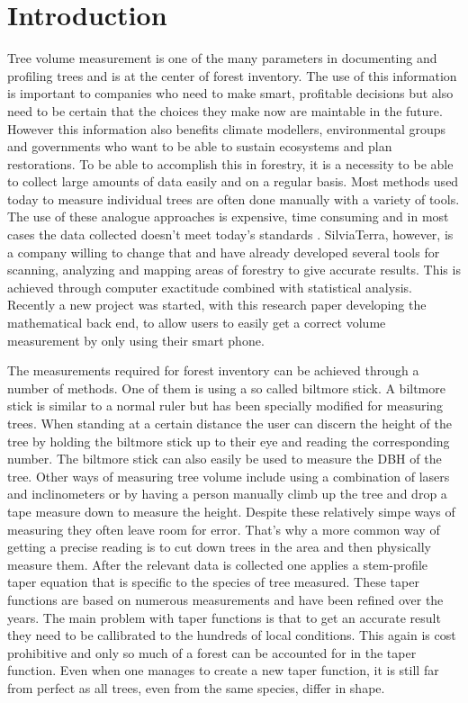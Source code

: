 

\newcommand{\degree}{$^\circ$}

\section{Introduction}
Tree volume measurement is one of the many parameters in documenting and profiling trees and is at the center of forest inventory. The use of this information is important to companies who need to make smart, profitable decisions but also need to be certain that the choices they make now are maintable in the future. However this information also benefits climate modellers, environmental groups and governments who want to be able to sustain ecosystems and plan restorations. To be able to accomplish this in forestry, it is a necessity to be able to collect large amounts of data easily and on a regular basis. Most methods used today to measure individual trees are often done manually with a variety of tools. The use of these analogue approaches is expensive, time consuming and in most cases the data collected doesn't meet today's standards \cite{digital imaged based tree measurement for forest inventory}. SilviaTerra, however, is a company willing to change that and have already developed several tools for scanning, analyzing and mapping areas of forestry to give accurate results. This is achieved through computer exactitude combined with statistical analysis. Recently a new project was started, with this research paper developing the mathematical back end, to allow users to easily get a correct volume measurement by only using their smart phone.

The measurements required for forest inventory can be achieved through a number of methods. One of them is using a so called biltmore stick. A biltmore stick is similar to a normal ruler but has been specially modified for measuring trees. When standing at a certain distance the user can discern the height of the tree by holding the biltmore stick up to their eye and reading the corresponding number. The biltmore stick can also easily be used to measure the DBH of the tree. Other ways of measuring tree volume include using a combination of lasers and inclinometers or by having a person manually climb up the tree and drop a tape measure down to measure the height. Despite these relatively simpe ways of measuring they often leave room for error. That’s why a more common way of getting a precise reading is to cut down trees in the area and then physically measure them. After the relevant data is collected one applies a stem-profile taper equation that is specific to the species of tree measured. These taper functions are based on numerous measurements and have been refined over the years. The main problem with taper functions is that to get an accurate result they need to be callibrated to the hundreds of local conditions. This again is cost prohibitive and only so much of a forest can be accounted for in the taper function. Even when one manages to create a new taper function, it is still far from perfect as all trees, even from the same species, differ in shape.

